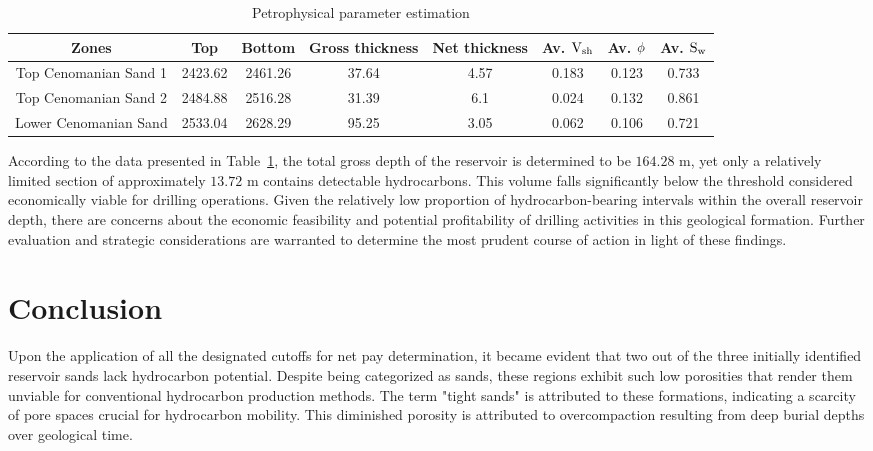 \documentclass{gji}
\begin{document}
%
%
\begin{table}%
    \centering
    \caption{Petrophysical parameter estimation}
    \label{tab:params}
    \begin{tabular}{|c|c|c|c|c|c|c|c|}
        \hline
        \textbf{Zones} & \textbf{Top} & \textbf{Bottom} & \textbf{Gross thickness} & \textbf{Net thickness} & \textbf{Av. \(\rm V_{sh}\)} & \textbf{Av. \(\rm \phi\)} & \textbf{Av. \(\rm S_w\)} \\
        \hline
        Top Cenomanian Sand 1 & 2423.62 & 2461.26 & 37.64 & 4.57 & 0.183 & 0.123 & 0.733 \\
        \hline
        Top Cenomanian Sand 2 & 2484.88 & 2516.28 & 31.39 & 6.1 & 0.024 & 0.132 &  0.861\\
        \hline
        Lower Cenomanian Sand  & 2533.04 & 2628.29 & 95.25 & 3.05 & 0.062 & 0.106 &  0.721\\
        \hline
    \end{tabular}    
\end{table}
%
According to the data presented in Table~\ref{tab:params}, the total gross depth of the reservoir is determined to be $164.28$ m, yet only a relatively limited section of approximately $13.72$ m contains detectable hydrocarbons.
This volume falls significantly below the threshold considered economically viable for drilling operations.
Given the relatively low proportion of hydrocarbon-bearing intervals within the overall reservoir depth, there are concerns about the economic feasibility and potential profitability of drilling activities in this geological formation.
Further evaluation and strategic considerations are warranted to determine the most prudent course of action in light of these findings.

\section{Conclusion} \label{sec:conc}

Upon the application of all the designated cutoffs for net pay determination, it became evident that two out of the three initially identified reservoir sands lack hydrocarbon potential. Despite being categorized as sands, these regions exhibit such low porosities that render them unviable for conventional hydrocarbon production methods.
The term "tight sands" is attributed to these formations, indicating a scarcity of pore spaces crucial for hydrocarbon mobility. 
This diminished porosity is attributed to overcompaction resulting from deep burial depths over geological time.
\end{document}

